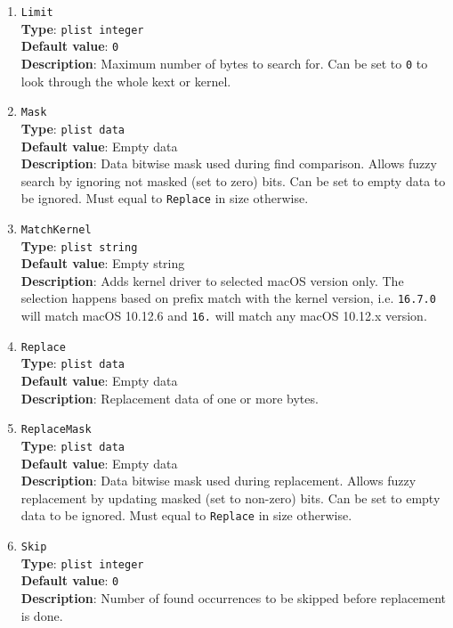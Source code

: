\documentclass[]{article}
\begin{document}
\begin{enumerate}
\item
  \texttt{Limit}\\
  \textbf{Type}: \texttt{plist\ integer}\\
  \textbf{Default value}: \texttt{0}\\
  \textbf{Description}: Maximum number of bytes to search for. Can be set to
  \texttt{0} to look through the whole kext or kernel.

\item
  \texttt{Mask}\\
  \textbf{Type}: \texttt{plist\ data}\\
  \textbf{Default value}: Empty data\\
  \textbf{Description}: Data bitwise mask used during find comparison.
  Allows fuzzy search by ignoring not masked (set to zero) bits. Can be
  set to empty data to be ignored. Must equal to \texttt{Replace} in size
  otherwise.

\item
  \texttt{MatchKernel}\\
  \textbf{Type}: \texttt{plist\ string}\\
  \textbf{Default value}: Empty string\\
  \textbf{Description}: Adds kernel driver to selected macOS version only.
  The selection happens based on prefix match with the kernel version, i.e.
  \texttt{16.7.0} will match macOS 10.12.6 and \texttt{16.} will match
  any macOS 10.12.x version.

\item
  \texttt{Replace}\\
  \textbf{Type}: \texttt{plist\ data}\\
  \textbf{Default value}: Empty data\\
  \textbf{Description}: Replacement data of one or more bytes.

\item
  \texttt{ReplaceMask}\\
  \textbf{Type}: \texttt{plist\ data}\\
  \textbf{Default value}: Empty data\\
  \textbf{Description}: Data bitwise mask used during replacement.
  Allows fuzzy replacement by updating masked (set to non-zero) bits. Can be
  set to empty data to be ignored. Must equal to \texttt{Replace} in size
  otherwise.

\item
  \texttt{Skip}\\
  \textbf{Type}: \texttt{plist\ integer}\\
  \textbf{Default value}: \texttt{0}\\
  \textbf{Description}: Number of found occurrences to be skipped before replacement
  is done.

\end{enumerate}
\end{document}
